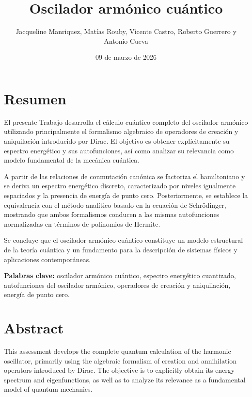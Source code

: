 \documentclass[11pt,a4paper,spanish]{book}
\title{Oscilador armónico cuántico}
\author{Jacqueline Manriquez, Matías Rouby, Vicente Castro, Roberto Guerrero y Antonio Cueva}
\date{09 de marzo de 2026}
\begin{document}
\renewcommand{\listfigurename}{Índice de figuras}
\renewcommand{\listtablename}{Índice de tablas}
\renewcommand{\contentsname}{Índice de contenidos}
\renewcommand{\figurename}{Figura}
\renewcommand{\tablename}{Tabla} 

\maketitle

\frontmatter
\tableofcontents
\listoffigures %
\listoftables %





\chapter{Resumen}


El presente Trabajo desarrolla el cálculo cuántico completo del oscilador armónico utilizando principalmente el formalismo algebraico de operadores de creación y aniquilación introducido por Dirac. El objetivo es obtener explícitamente su espectro energético y sus autofunciones, así como analizar su relevancia como modelo fundamental de la mecánica cuántica. 

A partir de las relaciones de conmutación canónica se factoriza el hamiltoniano y se deriva un espectro energético discreto, caracterizado por niveles igualmente espaciados y la presencia de energía de punto cero. Posteriormente, se establece la equivalencia con el método analítico basado en la ecuación de Schrödinger, mostrando que ambos formalismos conducen a las mismas autofunciones normalizadas en términos de polinomios de Hermite. 

Se concluye que el oscilador armónico cuántico constituye un modelo estructural de la teoría cuántica y un fundamento para la descripción de sistemas físicos y aplicaciones contemporáneas.

\vspace{1cm}

{\bf Palabras clave:} oscilador armónico cuántico, espectro energético cuantizado, autofunciones del oscilador armónico, operadores de creación y aniquilación, energía de punto cero.


\chapter{Abstract}
This assessment develops the complete quantum calculation of the harmonic oscillator, primarily using the algebraic formalism of creation and annihilation operators introduced by Dirac. The objective is to explicitly obtain its energy spectrum and eigenfunctions, as well as to analyze its relevance as a fundamental model of quantum mechanics.
\end{document}
